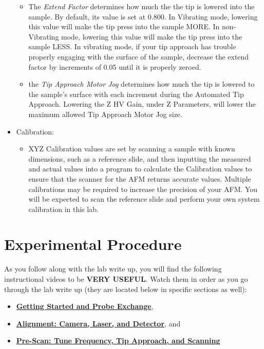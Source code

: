 \documentclass{../lab}
\begin{document}
\begin{itemize}
\begin{itemize}
        \item The \emph{Extend Factor} determines how much the the tip is lowered into the sample.  By default, its value is set at 0.800. In Vibrating mode, lowering this value will make the tip press into the sample MORE.  In non-Vibrating mode, lowering this value will make the tip press into the sample LESS.  In vibrating mode, if your tip approach has trouble properly engaging with the surface of the sample, decrease the extend factor by increments of 0.05 until it is properly zeroed.

        \item the \emph{Tip Approach Motor Jog} determines how much the tip is lowered to the sample's surface with each increment during the Automated Tip Approach.  Lowering the Z HV Gain, under Z Parameters, will lower the maximum allowed Tip Approach Motor Jog size.
    \end{itemize}

    \item Calibration:
    \begin{itemize}
        \item XYZ Calibration values are set by scanning a sample with known dimensions, such as a reference slide, and then inputting the measured and actual values into a program to calculate the Calibration values to ensure that the scanner for the AFM returns accurate values. Multiple calibrations may be required to increase the precision of your AFM. You will be expected to scan the reference slide and perform your own system calibration in this lab.
    \end{itemize}

\end{itemize}

\section{Experimental Procedure}

As you follow along with the lab write up, you will find the following instructional videos to be \textbf{VERY USEFUL}. Watch them in order as you go through the lab write up (they are located below in specific sections as well):

\begin{itemize}
    \item \href{http://experimentationlab.berkeley.edu/sites/default/files/gettingstarted\_final2.mp4}{\textbf{Getting Started and Probe Exchange}},

    \item \href{http://experimentationlab.berkeley.edu/sites/default/files/alignment\_final2.mp4}{\textbf{Alignment: Camera, Laser, and Detector}}, and

    \item \href{http://experimentationlab.berkeley.edu/sites/default/files/prescan\_final2.mp4}{\textbf{Pre-Scan: Tune Frequency, Tip Approach, and Scanning}}
\end{itemize}
\end{document}
